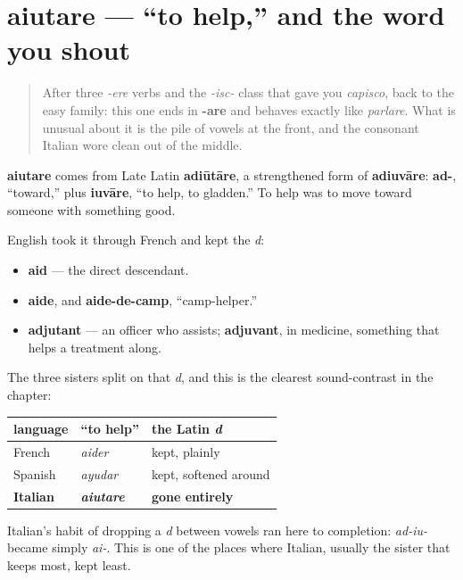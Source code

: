 \section[aiutare]{aiutare — \textquotedblleft{}to help,\textquotedblright{} and the word you shout}

\label{lesson:IT-C19-aiutare}



\begin{quote}
After three \emph{-ere} verbs and the \emph{-isc-} class that gave you \emph{capisco}, back to the easy family: this one ends in \textbf{-are} and behaves exactly like \emph{parlare}. What is unusual about it is the pile of vowels at the front, and the consonant Italian wore clean out of the middle.
\end{quote}

\begin{cousinweb}
\textbf{aiutare} comes from Late Latin \textbf{adiūtāre}, a strengthened form of \textbf{adiuvāre}: \textbf{ad-}, \textquotedblleft{}toward,\textquotedblright{} plus \textbf{iuvāre}, \textquotedblleft{}to help, to gladden.\textquotedblright{} To help was to move toward someone with something good.

English took it through French and kept the \emph{d}:

\begin{itemize}
\raggedright
  \item \textbf{aid} — the direct descendant.
  \item \textbf{aide}, and \textbf{aide-de-camp}, \textquotedblleft{}camp-helper.\textquotedblright{}
  \item \textbf{adjutant} — an officer who assists; \textbf{adjuvant}, in medicine, something that helps a treatment along.
\end{itemize}

The three sisters split on that \emph{d}, and this is the clearest sound-contrast in the chapter:

\noindent
\begin{tabularx}{\linewidth}{@{}>{\raggedright\arraybackslash}X>{\raggedright\arraybackslash}X>{\raggedright\arraybackslash}X@{}}
\toprule
\textbf{language} & \textbf{\textquotedblleft{}to help\textquotedblright{}} & \textbf{the Latin \emph{d}} \\
\midrule
French & \emph{aider} & kept, plainly \\
Spanish & \emph{ayudar} & kept, softened around \\
\textbf{Italian} & \emph{\textbf{aiutare}} & \textbf{gone entirely} \\
\bottomrule
\end{tabularx}

Italian's habit of dropping a \emph{d} between vowels ran here to completion: \emph{ad-iu-} became simply \emph{ai-}. This is one of the places where Italian, usually the sister that keeps most, kept least.
\end{cousinweb}

